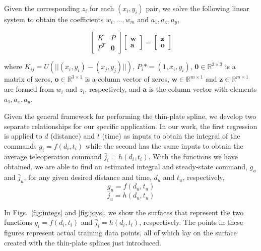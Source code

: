 \documentclass[letterpaper, 10 pt, conference]{ieeeconf}  %
\begin{document}
Given the corresponding $z_i$ for each $(x_i,y_i)$ pair, we solve the following linear system to obtain the coefficients $w_i,\ldots,w_m$ and $a_1,a_x,a_y$,

\begin{equation}
    \begin{bmatrix}
    K&P\\
    P^T& \bm{0}
    \end{bmatrix}
    \begin{bmatrix}
    \bm{w}\\
    \bm{a}
    \end{bmatrix} = 
    \begin{bmatrix}
    \bm{z}\\
    \bm{o}
    \end{bmatrix}
\end{equation}

where $K_{ij} = U(||(x_i,y_i)-(x_j,y_j)||)$, $P_i* = (1,x_i,y_i)$, $\bm{0}  \in \mathbb{R}^{3\times3}$ is a matrix of zeros, $\bm{o} \in \mathbb{R}^{3\times1}$ is a column vector of zeros, $\bm{w} \in \mathbb{R}^{m\times1}$ and $\bm{z} \in \mathbb{R}^{m\times1}$ are formed from $w_i$ and $z_i$, respectively, and $\bm{a}$ is the column vector with elements $a_1,a_x,a_y$.

Given the general framework for performing the thin-plate spline, we develop two separate relationships for our specific application. In our work, the first regression is applied to $d$ (distance) and $t$ (time) as inputs to obtain the integral of the commands $g_i = f(d_i,t_i)$ while the second has the same inputs to obtain the average teleoperation command $\bar{j}_i = h(d_i,t_i)$. With the functions we have obtained, we are able to find an estimated integral and steady-state command, $g_u$ and $\bar{j}_u$, for any given desired distance and time, $d_u$ and $t_u$, respectively,
\begin{equation} \label{eq:integralfit}
g_u = f(d_u,t_u)
\end{equation}
\begin{equation} \label{eq:ssvelfit}
\bar{j}_u = h(d_u,t_u)
\end{equation}

In Figs.~\ref{fig:integs} and \ref{fig:joys}, we show the surfaces that represent the two functions $g_i = f(d_i,t_i)$ and $\bar{j}_i = h(d_i,t_i)$, respectively. The points in these figures represent actual training data points, all of which lay on the surface created with the thin-plate splines just introduced.
\end{document}
